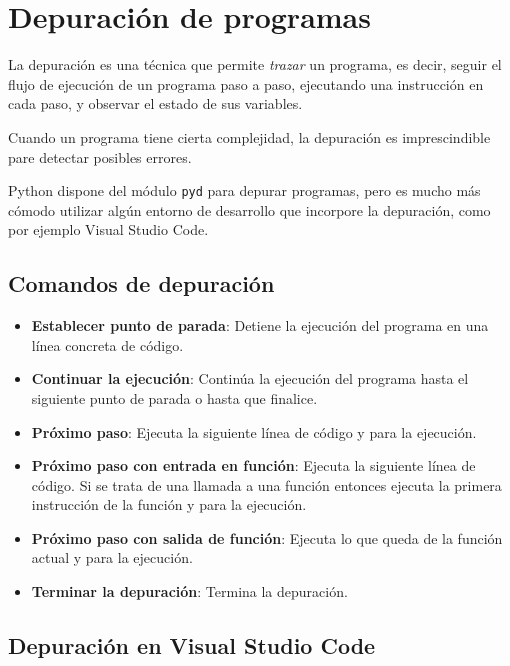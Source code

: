\documentclass[
  spanish,
  a4paper,
]{scrreport}
\providecommand{\tightlist}{%
  \setlength{\itemsep}{0pt}\setlength{\parskip}{0pt}}
\begin{document}
\section{Depuración de programas}\label{depuraciuxf3n-de-programas}

La depuración es una técnica que permite \emph{trazar} un programa, es
decir, seguir el flujo de ejecución de un programa paso a paso,
ejecutando una instrucción en cada paso, y observar el estado de sus
variables.

Cuando un programa tiene cierta complejidad, la depuración es
imprescindible pare detectar posibles errores.

Python dispone del módulo \texttt{pyd} para depurar programas, pero es
mucho más cómodo utilizar algún entorno de desarrollo que incorpore la
depuración, como por ejemplo Visual Studio Code.

\subsection{Comandos de depuración}\label{comandos-de-depuraciuxf3n}

\begin{itemize}
\tightlist
\item
  \textbf{Establecer punto de parada}: Detiene la ejecución del programa
  en una línea concreta de código.
\item
  \textbf{Continuar la ejecución}: Continúa la ejecución del programa
  hasta el siguiente punto de parada o hasta que finalice.
\item
  \textbf{Próximo paso}: Ejecuta la siguiente línea de código y para la
  ejecución.
\item
  \textbf{Próximo paso con entrada en función}: Ejecuta la siguiente
  línea de código. Si se trata de una llamada a una función entonces
  ejecuta la primera instrucción de la función y para la ejecución.
\item
  \textbf{Próximo paso con salida de función}: Ejecuta lo que queda de
  la función actual y para la ejecución.
\item
  \textbf{Terminar la depuración}: Termina la depuración.
\end{itemize}

\subsection{Depuración en Visual Studio
Code}\label{depuraciuxf3n-en-visual-studio-code}
\end{document}
